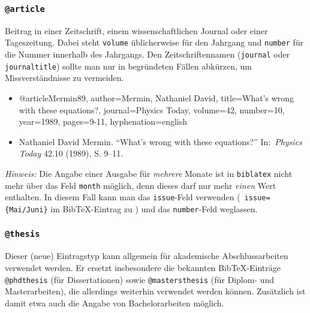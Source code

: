 \subsubsection{\texttt{@article}}
\label{sec:@article}
Beitrag in einer Zeitschrift, einem wissenschaftlichen Journal oder einer Tageszeitung.
Dabei steht \texttt{volume} üblicherweise für den Jahrgang und \texttt{number} für die 
Nummer innerhalb des Jahrgangs. Den Zeitschriftennamen (\texttt{journal} oder
\texttt{journaltitle}) sollte man nur in begründeten Fällen abkürzen, um Missverständnisse
zu vermeiden.
%
\begin{itemize}
\item[]
\begin{GenericCode}[numbers=none]
@article{Mermin89,
	author={Mermin, Nathaniel David},
	title={What's wrong with these equations?},
	journal={Physics Today},
	volume={42},
	number={10},
	year={1989},
	pages={9-11},
	hyphenation={english}
}
\end{GenericCode}
\item[\cite{Mermin89}]
Nathaniel David Mermin. "`What's wrong with these equations?"' In:\ \textit{Physics
Today} 42.10 (1989), S. 9--11.
\end{itemize}
%
\emph{Hinweis:} Die Angabe einer Ausgabe für \emph{mehrere} Monate ist in \texttt{biblatex} nicht mehr
über das Feld \texttt{month} möglich, denn dieses darf nur mehr \emph{einen} Wert enthalten.
In diesem Fall kann man das \texttt{issue}-Feld verwenden (\zB\ \verb!issue={Mai/Juni}!
im BibTeX-Eintrag zu \cite{Guttman01}) und das \texttt{number}-Feld weglassen.



\subsubsection{\texttt{@thesis}}
\label{sec:@thesis}
Dieser (neue) Eintragstyp kann allgemein für akademische Abschlussarbeiten verwendet werden. Er ersetzt
insbesondere die bekannten BibTeX-Einträge \texttt{@phdthesis} (für Dissertationen) sowie
\texttt{@mastersthesis} (für Diplom- und Masterarbeiten), die allerdings weiterhin verwendet werden können. Zusätzlich ist damit etwa auch die Angabe von Bachelorarbeiten möglich.

\bigskip %
